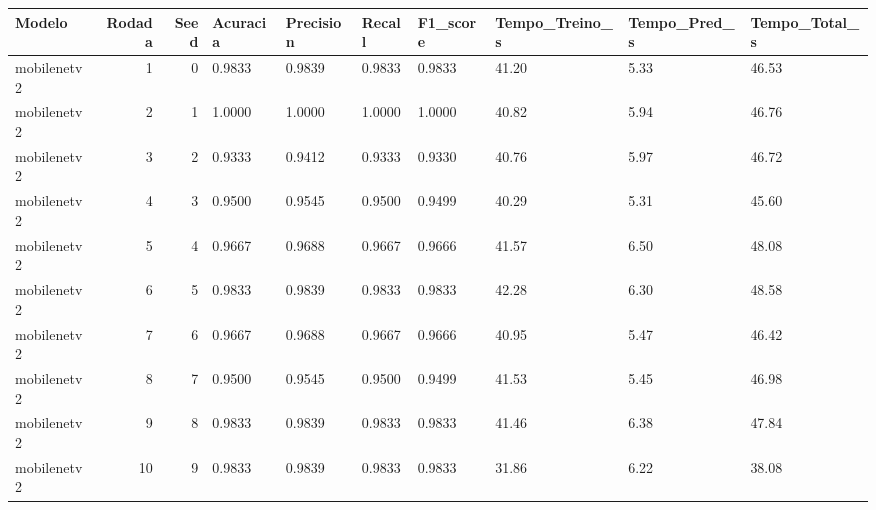 \begin{tabular}{lrrlllllll}
\toprule
Modelo & Rodada & Seed & Acuracia & Precision & Recall & F1_score & Tempo_Treino_s & Tempo_Pred_s & Tempo_Total_s \\
\midrule
mobilenetv2 & 1 & 0 & 0.9833 & 0.9839 & 0.9833 & 0.9833 & 41.20 & 5.33 & 46.53 \\
mobilenetv2 & 2 & 1 & 1.0000 & 1.0000 & 1.0000 & 1.0000 & 40.82 & 5.94 & 46.76 \\
mobilenetv2 & 3 & 2 & 0.9333 & 0.9412 & 0.9333 & 0.9330 & 40.76 & 5.97 & 46.72 \\
mobilenetv2 & 4 & 3 & 0.9500 & 0.9545 & 0.9500 & 0.9499 & 40.29 & 5.31 & 45.60 \\
mobilenetv2 & 5 & 4 & 0.9667 & 0.9688 & 0.9667 & 0.9666 & 41.57 & 6.50 & 48.08 \\
mobilenetv2 & 6 & 5 & 0.9833 & 0.9839 & 0.9833 & 0.9833 & 42.28 & 6.30 & 48.58 \\
mobilenetv2 & 7 & 6 & 0.9667 & 0.9688 & 0.9667 & 0.9666 & 40.95 & 5.47 & 46.42 \\
mobilenetv2 & 8 & 7 & 0.9500 & 0.9545 & 0.9500 & 0.9499 & 41.53 & 5.45 & 46.98 \\
mobilenetv2 & 9 & 8 & 0.9833 & 0.9839 & 0.9833 & 0.9833 & 41.46 & 6.38 & 47.84 \\
mobilenetv2 & 10 & 9 & 0.9833 & 0.9839 & 0.9833 & 0.9833 & 31.86 & 6.22 & 38.08 \\
\bottomrule
\end{tabular}
